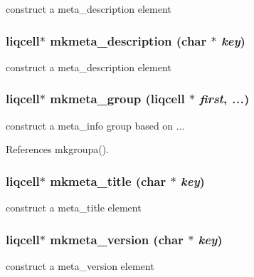 construct a meta\_\-description element 
\subsubsection[{mkmeta\_\-description}]{\setlength{\rightskip}{0pt plus 5cm}liqcell$\ast$ mkmeta\_\-description (char $\ast$ {\em key})}\label{d4/d54/liqcell__mk__star_8c_d7e5ab2e14c9c333db98885676c62a79}


construct a meta\_\-description element 
\subsubsection[{mkmeta\_\-group}]{\setlength{\rightskip}{0pt plus 5cm}liqcell$\ast$ mkmeta\_\-group (liqcell $\ast$ {\em first}, \/   {\em ...})}\label{d4/d54/liqcell__mk__star_8c_d8f914b6b726606c9c952149d0bc4266}


construct a meta\_\-info group based on ... 

References mkgroupa().
\subsubsection[{mkmeta\_\-title}]{\setlength{\rightskip}{0pt plus 5cm}liqcell$\ast$ mkmeta\_\-title (char $\ast$ {\em key})}\label{d4/d54/liqcell__mk__star_8c_0607d834c2a4ebc0117888c5b072d46a}


construct a meta\_\-title element 
\subsubsection[{mkmeta\_\-version}]{\setlength{\rightskip}{0pt plus 5cm}liqcell$\ast$ mkmeta\_\-version (char $\ast$ {\em key})}\label{d4/d54/liqcell__mk__star_8c_c895cc20f7fe59dbc6f58ee03a5135e6}


construct a meta\_\-version element 